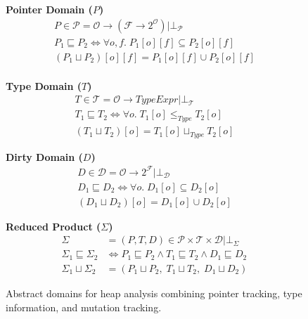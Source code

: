 \begin{figure*}[t]
\centering

\begin{minipage}[t]{0.32\textwidth}
\centering
\textbf{Pointer Domain ($P$)}
\begin{gather*}
P \in \mathcal{P} = \mathcal{O} \to (\mathcal{F} \to 2^{\mathcal{O}}) | \bot_\mathcal{P} \\[0.3em]
P_1 \sqsubseteq P_2 \iff \forall o,f.\; P_1[o][f] \subseteq P_2[o][f] \\[0.3em]
(P_1 \sqcup P_2)[o][f] = P_1[o][f] \cup P_2[o][f] \\
\end{gather*}
\end{minipage}%
\hfill
\begin{minipage}[t]{0.32\textwidth}
\centering
\textbf{Type Domain ($T$)}
\begin{gather*}
T \in \mathcal{T} = \mathcal{O} \to \mathit{TypeExpr} | \bot_\mathcal{T} \\[0.3em]
T_1 \sqsubseteq T_2 \iff \forall o.\; T_1[o] \leq_{\mathit{Type}} T_2[o] \\[0.3em]
(T_1 \sqcup T_2)[o] = T_1[o] \sqcup_{\mathit{Type}} T_2[o]
\end{gather*}
\end{minipage}%
\hfill
\begin{minipage}[t]{0.32\textwidth}
\centering
\textbf{Dirty Domain ($D$)}
\begin{gather*}
D \in \mathcal{D} = \mathcal{O} \to 2^{\mathcal{F}} | \bot_\mathcal{D} \\[0.3em]
D_1 \sqsubseteq D_2 \iff \forall o.\; D_1[o] \subseteq D_2[o] \\[0.3em]
(D_1 \sqcup D_2)[o] = D_1[o] \cup D_2[o]
\end{gather*}
\end{minipage}

\vspace{1.5em}

\noindent\textbf{Reduced Product ($\Sigma$)}
\begin{align*}
\Sigma &= (P,T,D) \in \mathcal{P} \times \mathcal{T} \times \mathcal{D} | \bot_\mathcal{\Sigma}\\[0.3em]
\Sigma_1 \sqsubseteq \Sigma_2 &\iff P_1 \sqsubseteq P_2 \land T_1 \sqsubseteq T_2 \land D_1 \sqsubseteq D_2 \\[0.3em]
\Sigma_1 \sqcup \Sigma_2 &= (P_1 \sqcup P_2,\; T_1 \sqcup T_2,\; D_1 \sqcup D_2)
\end{align*}

\caption{Abstract domains for heap analysis combining pointer tracking, type information, and mutation tracking.}
\label{fig:abstract-domains}
\end{figure*}

